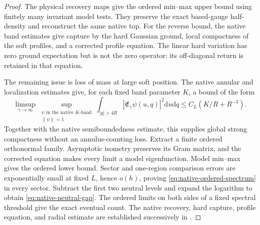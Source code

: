 \documentclass[11pt,oneside,openany]{book}
\theoremstyle{definition}
\theoremstyle{remark}
\newcommand{\dd}{\mathrm d}
\newcommand{\norm}[1]{\left\lVert#1\right\rVert}
\newcommand{\src}[2]{\cite[#2]{#1}}
\begin{document}
\begin{proof}
The physical recovery maps give the ordered min--max upper bound
using finitely many invariant model tests. They preserve the exact
based-gauge half-density and reconstruct the same native top.
For the reverse bound, the native band estimates give capture by the
hard Gaussian ground, local compactness of the soft profiles, and a
corrected profile equation. The linear hard variation has zero ground
expectation but is not the zero operator: its off-diagonal return is
retained in that equation.

The remaining issue is loss of mass at large soft position. The
native annular and localization estimates give, for each fixed band
parameter $K$, a bound of the form
\[
 \limsup_{\gamma\to\infty}
 \sup_{\substack{\psi\text{ in the native }K\text{-band}\\\norm\psi=1}}
 \int_{|q|>4R}|\mathfrak E_\gamma\psi(u,q)|^2\dd u\dd q
                    \le C_L(K/R+R^{-3}).
\]
Together with the native semiboundedness estimate, this supplies
global strong compactness without an annulus-counting loss.
Extract a finite ordered orthonormal family. Asymptotic isometry
preserves its Gram matrix, and the corrected equation makes every
limit a model eigenfunction. Model min--max gives the ordered lower
bound. Sector and one-region comparison errors are exponentially
small at fixed $L$, hence $o(h)$, proving
\cref{eq:native-ordered-spectrum} in every sector. Subtract the first
two neutral levels and expand the logarithm to obtain
\cref{eq:native-neutral-gap}. The ordered limits on both sides of a
fixed spectral threshold give the exact eventual count.
The native recovery, hard capture, profile equation, and radial
estimate are established successively in \src{F16}{V41--V48}.
\end{proof}
\end{document}
